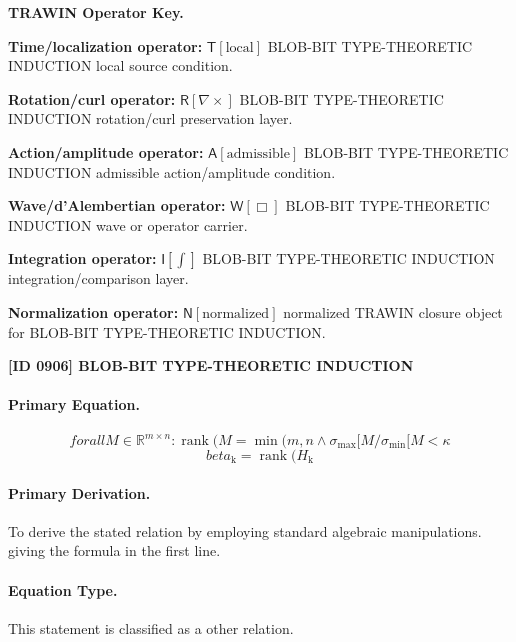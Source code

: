 \par\vspace{0.45\baselineskip}
\noindent\begin{minipage}[t]{\linewidth}
\begingroup
\small
\raggedright
\textbf{TRAWIN Operator Key.}\par
\noindent\textbf{Time/localization operator:} $\mathsf{T}\!\left[\mathrm{local}\right]$ BLOB-BIT TYPE-THEORETIC INDUCTION local source condition.\par
\noindent\textbf{Rotation/curl operator:} $\mathsf{R}\!\left[\nabla\times\right]$ BLOB-BIT TYPE-THEORETIC INDUCTION rotation/curl preservation layer.\par
\noindent\textbf{Action/amplitude operator:} $\mathsf{A}\!\left[\mathrm{admissible}\right]$ BLOB-BIT TYPE-THEORETIC INDUCTION admissible action/amplitude condition.\par
\noindent\textbf{Wave/d'Alembertian operator:} $\mathsf{W}\!\left[\Box\right]$ BLOB-BIT TYPE-THEORETIC INDUCTION wave or operator carrier.\par
\noindent\textbf{Integration operator:} $\mathsf{I}\!\left[\int\right]$ BLOB-BIT TYPE-THEORETIC INDUCTION integration/comparison layer.\par
\noindent\textbf{Normalization operator:} $\mathsf{N}\!\left[\mathrm{normalized}\right]$ normalized TRAWIN closure object for BLOB-BIT TYPE-THEORETIC INDUCTION.\par
\endgroup
\end{minipage}

\clearpage
\noindent\textbf{[ID 0906] BLOB-BIT TYPE-THEORETIC INDUCTION}\par
\vspace{0.35em}
\paragraph{Primary Equation.}
\[
forall M \in \mathbb{R}^{m\times n} : \operatorname{rank}(M = \min(m,n \wedge \sigma_{\mathrm{max}}[M/\sigma_{\min}[M < \kappa
\]
\[
beta_{\mathrm{k}} = \operatorname{rank}(H_{\mathrm{k}}
\]

\paragraph{Primary Derivation.}
To derive the stated relation by employing standard algebraic manipulations. giving the formula in the first line.
\paragraph{Equation Type.}
This statement is classified as a other relation.

